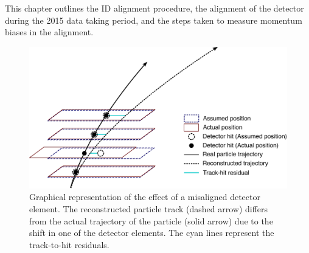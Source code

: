 This chapter outlines the ID alignment procedure, the alignment of the detector during the 2015 data taking period, and the steps taken to measure momentum biases in the alignment.  

\begin{figure}[htbp]
  \centering
  \includegraphics[width=.8\textwidth]{figs/alignment/misalignment}
  \caption{Graphical representation of the effect of a misaligned detector element.  The reconstructed particle track (dashed arrow) differs from the actual trajectory of the particle (solid arrow) due to the shift in one of the detector elements.  The cyan lines represent the track-to-hit residuals.}
  \label{fig:alignment_effects_misalign}
\end{figure}


%

